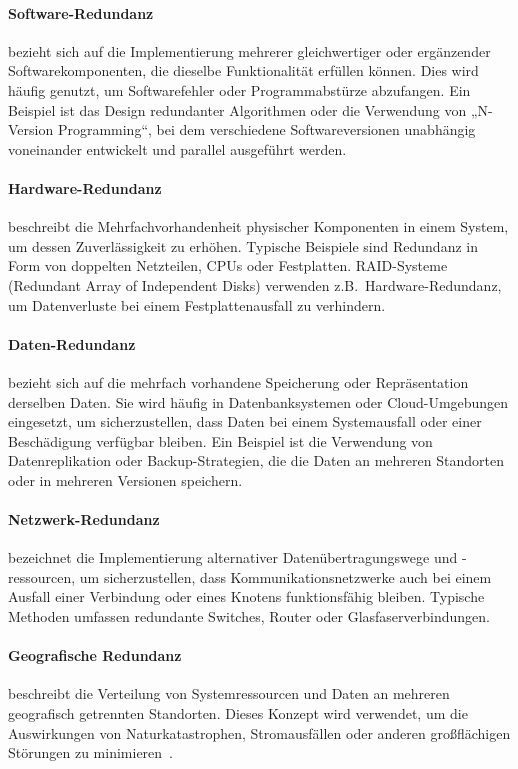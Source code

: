 \paragraph{Software-Redundanz} bezieht sich auf die Implementierung mehrerer gleichwertiger oder ergänzender
Softwarekomponenten, die dieselbe Funktionalität erfüllen können.
Dies wird häufig genutzt, um Softwarefehler oder Programmabstürze abzufangen.
Ein Beispiel ist das Design redundanter Algorithmen oder die Verwendung von „N-Version Programming“, bei
dem verschiedene Softwareversionen unabhängig voneinander entwickelt und parallel ausgeführt werden.
\paragraph{Hardware-Redundanz} beschreibt die Mehrfachvorhandenheit physischer Komponenten in einem System, um
dessen Zuverlässigkeit zu erhöhen.
Typische Beispiele sind Redundanz in Form von doppelten Netzteilen, CPUs oder Festplatten.
RAID-Systeme (Redundant Array of Independent Disks) verwenden z.B.\ Hardware-Redundanz,
um Datenverluste bei einem Festplattenausfall zu verhindern.
\paragraph{Daten-Redundanz} bezieht sich auf die mehrfach vorhandene Speicherung oder Repräsentation derselben Daten.
Sie wird häufig in Datenbanksystemen oder Cloud-Umgebungen eingesetzt, um sicherzustellen, dass Daten bei einem
Systemausfall oder einer Beschädigung verfügbar bleiben.
Ein Beispiel ist die Verwendung von Datenreplikation oder Backup-Strategien, die die Daten an mehreren
Standorten oder in mehreren Versionen speichern.
\paragraph{Netzwerk-Redundanz} bezeichnet die Implementierung alternativer Datenübertragungswege und -ressourcen,
um sicherzustellen, dass Kommunikationsnetzwerke auch bei einem Ausfall einer Verbindung oder eines Knotens
funktionsfähig bleiben.
Typische Methoden umfassen redundante Switches, Router oder Glasfaserverbindungen.
\paragraph{Geografische Redundanz} beschreibt die Verteilung von Systemressourcen und Daten an mehreren geografisch
getrennten Standorten.
Dieses Konzept wird verwendet, um die Auswirkungen von Naturkatastrophen, Stromausfällen oder
anderen großflächigen Störungen zu minimieren~\cite{g4g-redundancy}.


